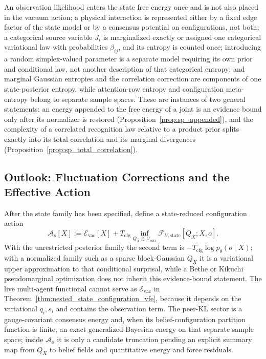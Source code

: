 \begin{remark}
\label{rem:beyond_mf_no_double_counting}
An observation likelihood enters the state free energy once and is not also placed in the vacuum action; a physical interaction is represented either by a fixed edge factor of the state model or by a consensus potential on configurations, not both; a categorical source variable $J_i$ is marginalized exactly or assigned one categorical variational law with probabilities $\beta_{ij}$, and its entropy is counted once; introducing a random simplex-valued parameter is a separate model requiring its own prior and conditional law, not another description of that categorical entropy; and marginal Gaussian entropies and the correlation correction are components of one state-posterior entropy, while attention-row entropy and configuration meta-entropy belong to separate sample spaces. These are instances of two general statements: an energy appended to the free energy of a joint is an evidence bound only after its normalizer is restored (Proposition~\ref{prop:sp_appended}), and the complexity of a correlated recognition law relative to a product prior splits exactly into its total correlation and its marginal divergences (Proposition~\ref{prop:sp_total_correlation}).
\end{remark}

\subsection{Outlook: Fluctuation Corrections and the Effective Action}

After the state family has been specified, define a state-reduced configuration action
\begin{equation}
\mathcal{A}_o[X]
:=\mathcal{E}_{\mathrm{vac}}[X]
+T_{\mathrm{cfg}}
\inf_{Q_X\in\mathcal{Q}_{\mathrm{corr}}}
\mathcal F_{V,\mathrm{state}}[Q_X;X,o].
\label{eq:beyond_mf_bare_action}
\end{equation}
With the unrestricted posterior family the second term is $-T_{\mathrm{cfg}}\log p_\theta(o\mid X)$; with a normalized family such as a sparse block-Gaussian $Q_X$ it is a variational upper approximation to that conditional surprisal, while a Bethe or Kikuchi pseudomarginal optimization does not inherit this evidence-bound statement. The live multi-agent functional cannot serve as $\mathcal{E}_{\mathrm{vac}}$ in Theorem~\ref{thm:nested_state_configuration_vfe}, because it depends on the variational $q_i,s_i$ and contains the observation term. The peer-KL sector is a gauge-covariant consensus energy and, when its belief-configuration partition function is finite, an exact generalized-Bayesian energy on that separate sample space; inside $\mathcal{A}_o$ it is only a candidate truncation pending an explicit summary map from $Q_X$ to belief fields and quantitative energy and force residuals.

